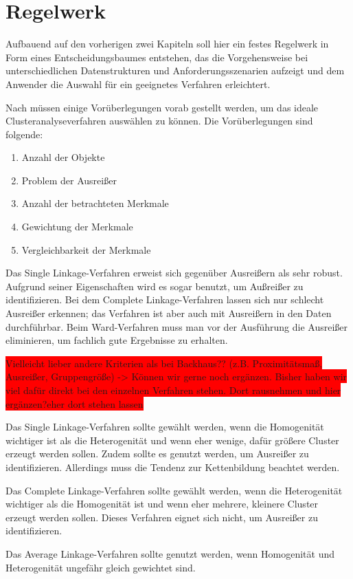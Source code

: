 \chapter{Regelwerk}

Aufbauend auf den vorherigen zwei Kapiteln soll hier ein festes Regelwerk in Form eines Entscheidungsbaumes entstehen, das die Vorgehensweise bei unterschiedlichen Datenstrukturen und Anforderungsszenarien aufzeigt und dem Anwender die Auswahl für ein geeignetes Verfahren erleichtert.

Nach \citet[S. 510]{Backhaus.2016} müssen einige Vorüberlegungen vorab gestellt werden, um das ideale Clusteranalyseverfahren auswählen zu können. Die Vorüberlegungen sind folgende:
\begin{enumerate}
    \item Anzahl der Objekte
    \item Problem der Ausreißer
    \item Anzahl der betrachteten Merkmale
    \item Gewichtung der Merkmale
    \item Vergleichbarkeit der Merkmale
\end{enumerate}

Das Single Linkage-Verfahren erweist sich gegenüber Ausreißern als sehr robust. Aufgrund seiner Eigenschaften wird es sogar benutzt, um Außreißer zu identifizieren. Bei dem Complete Linkage-Verfahren lassen sich nur schlecht Ausreißer erkennen; das Verfahren ist aber auch mit Ausreißern in den Daten durchführbar. Beim Ward-Verfahren muss man vor der Ausführung die Ausreißer eliminieren, um fachlich gute Ergebnisse zu erhalten.

\colorbox{red}{Vielleicht lieber andere Kriterien als bei Backhaus?? (z.B. Proximitätsmaß, Ausreißer, Gruppengröße) -> Können wir gerne noch ergänzen. Bisher haben wir viel dafür direkt bei den einzelnen Verfahren stehen. Dort rausnehmen und hier ergänzen?eher dort stehen lassen}

Das Single Linkage-Verfahren sollte gewählt werden, wenn die Homogenität wichtiger ist als die Heterogenität und wenn eher wenige, dafür größere Cluster erzeugt werden sollen. Zudem sollte es genutzt werden, um Ausreißer zu identifizieren. Allerdings muss die Tendenz zur Kettenbildung beachtet werden.

Das Complete Linkage-Verfahren sollte gewählt werden, wenn die Heterogenität wichtiger als die Homogenität ist und wenn eher mehrere, kleinere Cluster erzeugt werden sollen. Dieses Verfahren eignet sich nicht, um Ausreißer zu identifizieren.

Das Average Linkage-Verfahren sollte genutzt werden, wenn Homogenität und Heterogenität ungefähr gleich gewichtet sind.
